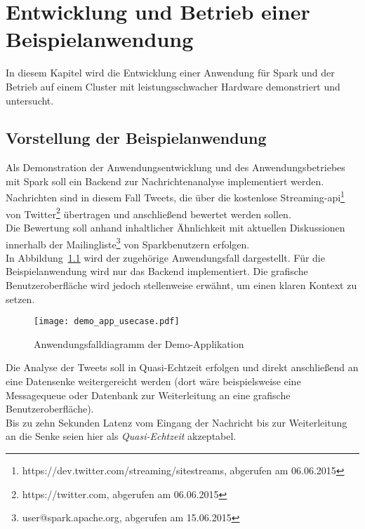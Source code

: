 \chapter{Entwicklung und Betrieb einer Beispielanwendung}

In diesem Kapitel wird die Entwicklung einer Anwendung für Spark und der Betrieb auf einem Cluster mit leistungsschwacher Hardware demonstriert und untersucht.

\section{Vorstellung der Beispielanwendung}

Als Demonstration der Anwendungsentwicklung und des Anwendungsbetriebes mit Spark soll ein Backend zur Nachrichtenanalyse implementiert werden.\\

Nachrichten sind in diesem Fall Tweets, die über die kostenlose Streaming-\gls{api}\footnote{https://dev.twitter.com/streaming/sitestreams, abgerufen am 06.06.2015} von Twitter\footnote{https://twitter.com, abgerufen am 06.06.2015} übertragen  und anschließend bewertet werden sollen.\\

Die Bewertung soll anhand inhaltlicher Ähnlichkeit mit aktuellen Diskussionen innerhalb der Mailingliste\footnote{user@spark.apache.org, abgerufen am 15.06.2015} von Sparkbenutzern erfolgen.\\

In Abbildung~\ref{figure:demo_app_usecase} wird der zugehörige Anwendungsfall dargestellt. Für die Beispielanwendung wird nur das Backend implementiert. Die grafische Benutzeroberfläche wird jedoch stellenweise erwähnt, um einen klaren Kontext zu setzen.\\

\begin{figure}[ht!]
	\centering
  \texttt{[image: demo\_app\_usecase.pdf]}
	\caption{Anwendungsfalldiagramm der Demo-Applikation}
	\label{figure:demo_app_usecase}
\end{figure}

Die Analyse der Tweets soll in Quasi-Echtzeit erfolgen und direkt anschließend an eine Datensenke weitergereicht werden (dort wäre beispielsweise eine Messagequeue oder Datenbank zur Weiterleitung an eine grafische Benutzeroberfläche).\\

Bis zu zehn Sekunden Latenz vom Eingang der Nachricht bis zur Weiterleitung an die Senke seien hier als \textit{Quasi-Echtzeit} akzeptabel.\\

